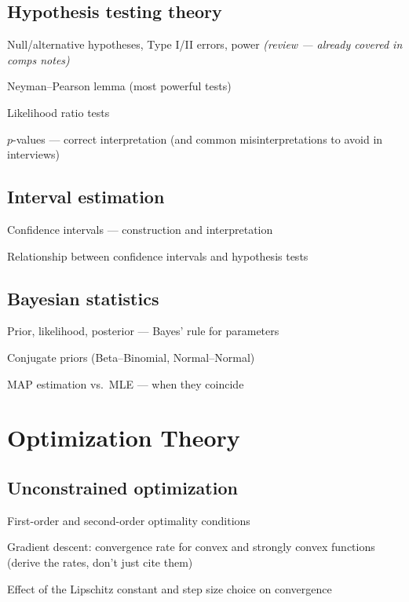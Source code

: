 \documentclass[11pt]{article}
\newcommand{\review}{\textit{(review — already covered in comps notes)}}
\begin{document}
\subsection{Hypothesis testing theory}
\begin{tasklist}
    \item Null/alternative hypotheses, Type I/II errors, power \review
    \item Neyman--Pearson lemma (most powerful tests)
    \item Likelihood ratio tests
    \item $p$-values — correct interpretation (and common misinterpretations to avoid in interviews)
\end{tasklist}

\subsection{Interval estimation}
\begin{tasklist}
    \item Confidence intervals — construction and interpretation
    \item Relationship between confidence intervals and hypothesis tests
\end{tasklist}

\subsection{Bayesian statistics}
\begin{tasklist}
    \item Prior, likelihood, posterior — Bayes' rule for parameters
    \item Conjugate priors (Beta--Binomial, Normal--Normal)
    \item MAP estimation vs.\ MLE — when they coincide
\end{tasklist}

\section{Optimization Theory}

\subsection{Unconstrained optimization}
\begin{tasklist}
    \item First-order and second-order optimality conditions
    \item Gradient descent: convergence rate for convex and strongly convex functions (derive the rates, don't just cite them)
    \item Effect of the Lipschitz constant and step size choice on convergence
\end{tasklist}
\end{document}
